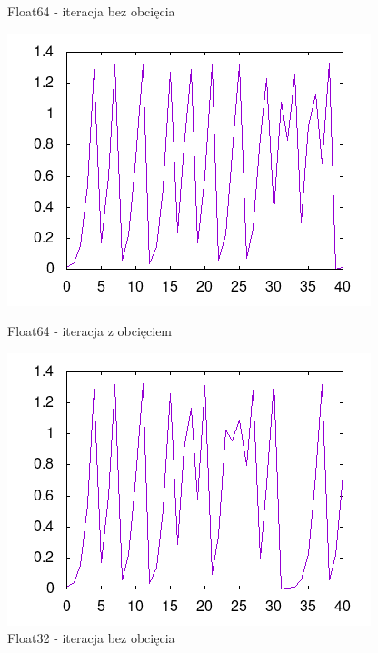 \documentclass[11pt, a4paper]{article}
\begin{document}
\begin{figure}[h]
  \begin{minipage}{0.48\textwidth}
    \centering
    \caption{Float64 - iteracja bez obcięcia}
    \includegraphics[width=\linewidth]{64}
  \end{minipage}
  \begin{minipage}{0.48\textwidth}
    \centering
    \caption{Float64 - iteracja z obcięciem}
    \includegraphics[width=\linewidth]{cut64}
  \end{minipage}
  \begin{minipage}{0.48\textwidth}
    \centering
    \caption{Float32 - iteracja bez obcięcia}

\end{minipage}
\end{figure}
\end{document}
